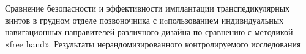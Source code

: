 
Сравнение безопасности и эффективности имплантации транспедикулярных
винтов в грудном отделе позвоночника с иcпользованием индивидуальных
навигационных направителей различного дизайна по сравнению с методикой
«free hand». Результаты нерандомизированного контролируемого
исследования
